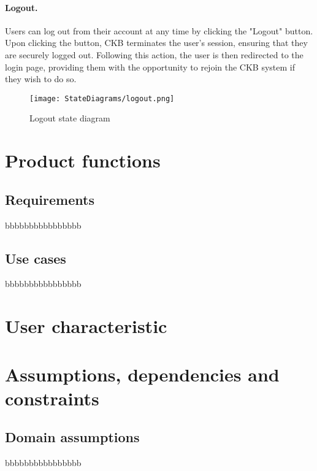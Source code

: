 \paragraph{Logout.}
Users can log out from their account at any time by clicking the "Logout" button. Upon clicking the button, CKB terminates the user's session, ensuring that they are securely logged out. Following this action, the user is then redirected to the login page, providing them with the opportunity to rejoin the CKB system if they wish to do so. 

\begin{figure}[H]
    \begin{center}
        \texttt{[image: StateDiagrams/logout.png]}
        \caption{Logout state diagram}
        \label{fig:logout_sd}%
    \end{center}
\end{figure}

\section{Product functions}
\label{sec:product_functions}%

\subsection{Requirements}
\label{subsec:requirements}%
bbbbbbbbbbbbbbbb

\subsection{Use cases}
\label{subsec:use_cases}%
bbbbbbbbbbbbbbbb

\section{User characteristic}
\label{sec:user_characteristic}%

\section{Assumptions, dependencies and constraints}
\label{sec:assumptions_dependencies_constraints}%

\subsection{Domain assumptions}
\label{subsec:domain_assumptions}%
bbbbbbbbbbbbbbbb
